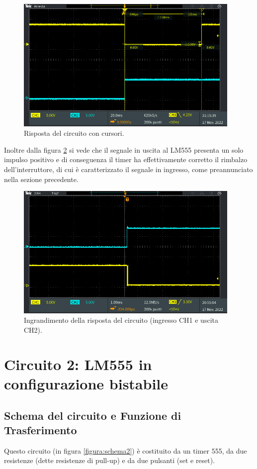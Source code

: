 \documentclass{report}
\begin{document}
\begin{figure}[h!]
	\centering
	\includegraphics[height=6.5cm]{immagini/TEK00010}
	\caption{Risposta del circuito con cursori.}
	\label{figura:TEK00010}
\end{figure}

\noindent Inoltre dalla figura \ref{figura:TEK00009} si vede che il segnale in uscita al LM555 presenta un solo impulso positivo e di conseguenza il timer ha effettivamente corretto il rimbalzo dell'interruttore, di cui è caratterizzato il segnale in ingresso, come preannunciato nella sezione precedente.

\begin{figure}[h!]
	\centering
	\includegraphics[height=6.5cm]{immagini/TEK00009}
	\caption{Ingrandimento della risposta del circuito (ingresso CH1 e uscita CH2).}
	\label{figura:TEK00009}
\end{figure}

\newpage
\section{Circuito 2: LM555 in configurazione bistabile}\label{sez2}
\subsection{Schema del circuito e Funzione di Trasferimento}
Questo circuito (in figura \ref{figura:schema2}) è costituito da un timer 555, da due resistenze (dette resistenze di pull-up) e da due pulsanti (set e reset).
\end{document}
